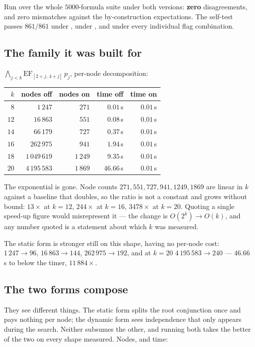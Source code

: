 Run over the whole $5000$-formula suite under both versions: \textbf{zero}
disagreements, and zero mismatches against the by-construction expectations.
The self-test passes $861/861$ under , under , and under every
individual flag combination.

\subsection{The family it was built for}

$\bigwedge_{j<k}\mathrm{EF}_{[2+j,\,4+j]}\,p_j$, per-node decomposition:

\begin{center}\small
\begin{tabular}{@{}rrrrr@{}}
\toprule
$k$ & nodes off & nodes on & time off & time on \\
\midrule
$8$  & $1\,247$      & $271$   & $0.01$\,s & $0.01$\,s \\
$12$ & $16\,863$     & $551$   & $0.08$\,s & $0.01$\,s \\
$14$ & $66\,179$     & $727$   & $0.37$\,s & $0.01$\,s \\
$16$ & $262\,975$    & $941$   & $1.94$\,s & $0.01$\,s \\
$18$ & $1\,049\,619$ & $1\,249$& $9.35$\,s & $0.01$\,s \\
$20$ & $4\,195\,583$ & $1\,869$& $46.66$\,s & $0.01$\,s \\
\bottomrule
\end{tabular}
\end{center}

The exponential is gone. Node counts $271, 551, 727, 941, 1249, 1869$ are linear
in $k$ against a baseline that doubles, so the ratio is not a constant and grows
without bound: $13\times$ at $k=12$, $244\times$ at $k=16$, $3478\times$ at
$k=20$. Quoting a single speed-up figure would misrepresent it --- the change is
$O(2^k)\to O(k)$, and any number quoted is a statement about which $k$ was
measured.

The static form is stronger still on this shape, having no per-node cost:
$1\,247\to 96$, $16\,863\to 144$, $262\,975\to 192$, and at $k=20$
$4\,195\,583\to 240$ --- $46.66$\,s to below the timer, $11\,884\times$.

\subsection{The two forms compose}

They see different things. The static form splits the root conjunction once and
pays nothing per node; the dynamic form sees independence that only appears
during the search. Neither subsumes the other, and running both takes the better
of the two on every shape measured. Nodes, and time:

